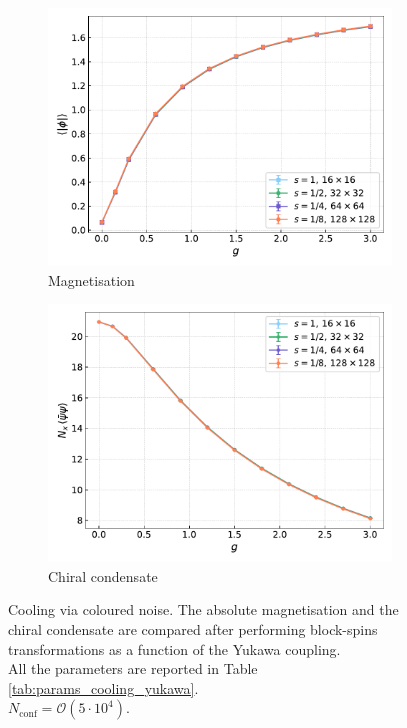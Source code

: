 \begin{figure}[hbp]
    \centering
    \begin{subfigure}[b]{0.49\textwidth}
        \includegraphics[width=\textwidth]{figures/cooling/yukawa_scan/magnetisation.pdf}
        \caption{Magnetisation}
    \end{subfigure}
    \hfill
    \begin{subfigure}[b]{0.49\textwidth}
        \includegraphics[width=\textwidth]{figures/cooling/yukawa_scan/condensate.pdf}
        \caption{Chiral condensate}
    \end{subfigure}
    \caption[Cooling stochastic quantisation: fields as a function of the Yukawa coupling.]{Cooling via coloured noise. The absolute magnetisation and the chiral condensate are compared after performing block-spins transformations as a function of the Yukawa coupling. \\ All the parameters are reported in  Table \ref{tab:params_cooling_yukawa}. \\$N_\text{conf} = \mathcal{O}(5 \cdot 10^4)$. }
    \label{fig:cooling_M_psibarpsi}
\end{figure}
